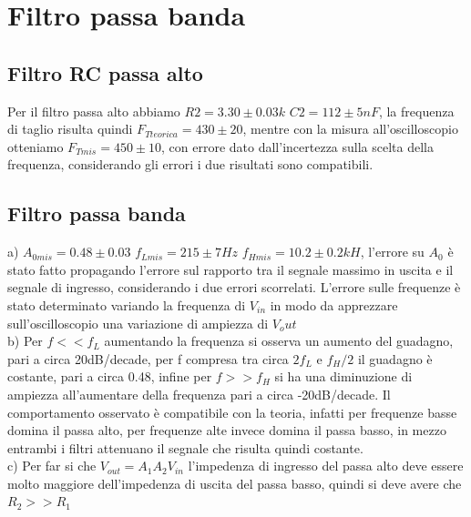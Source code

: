 \documentclass[10pt,a4paper]{article}
\begin{document}
\section{Filtro passa banda}
\subsection{Filtro RC passa alto}
Per il filtro passa alto abbiamo $R2=3.30\pm 0.03 k$ $C2=112\pm 5 nF$, la frequenza di taglio risulta quindi $F_{Tteorica}=430\pm20$, mentre con la misura all'oscilloscopio otteniamo $F_{Tmis}=450\pm10$, con errore dato dall'incertezza sulla scelta della frequenza, considerando gli errori i due risultati sono compatibili.
\subsection{Filtro passa banda}
a) $A_{0mis}=0.48\pm0.03$ $f_{Lmis}=215\pm7 Hz$ $f_{Hmis}=10.2\pm0.2 kH$, l'errore su $A_0$ è stato fatto propagando l'errore sul rapporto tra il segnale massimo in uscita e il segnale di ingresso, considerando i due errori scorrelati. L'errore sulle frequenze è stato determinato variando la frequenza di $V_{in}$ in modo da apprezzare sull’oscilloscopio una variazione di ampiezza di $V_out$\\
b) Per $f<<f_L$ aumentando la frequenza si osserva un aumento del guadagno, pari a circa 20dB/decade, per f compresa tra circa $2f_L$ e $f_H/2$ il guadagno è costante, pari a circa 0.48, infine per $f>>f_H$ si ha una diminuzione di ampiezza all'aumentare della frequenza pari a circa -20dB/decade. Il comportamento osservato è compatibile con la teoria, infatti per frequenze basse domina il passa alto, per frequenze alte invece domina il passa basso, in mezzo entrambi i filtri attenuano il segnale che risulta quindi costante.\\
c) Per far si che $V_{out}=A_1 A_2 V_{in}$ l'impedenza di ingresso del passa alto deve essere molto maggiore dell'impedenza di uscita del passa basso, quindi si deve avere che $R_2>>R_1$
\end{document}
